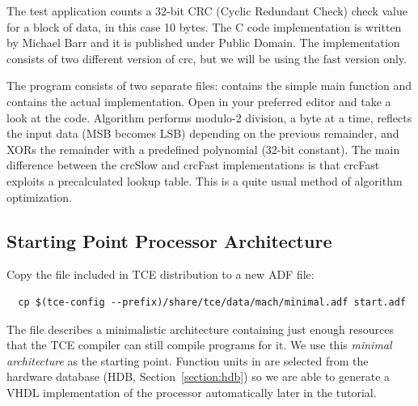 \documentclass[twoside]{tceusermanual}
\begin{document}
The test application counts a 32-bit CRC (Cyclic Redundant Check)
check value for a block of data, in this case 10 bytes. The C code
implementation is written by Michael Barr and it is published under
Public Domain. The implementation consists of two different version of
crc, but we will be using the fast version only.

The program consists of two separate files:  contains the
simple main function and  contains the actual
implementation. Open  in your preferred editor and take a
look at the code. Algorithm performs modulo-2 division, a byte at a
time, reflects the input data (MSB becomes LSB) depending on the
previous remainder, and XORs the remainder with a predefined
polynomial (32-bit constant). The main difference between the crcSlow
and crcFast implementations is that crcFast exploits a precalculated
lookup table. This is a quite usual method of algorithm optimization.

% 
% 
% 

\subsection{Starting Point Processor Architecture}
\label{ssec:start_point}


Copy the  file included in TCE distribution to a new ADF
file:

\begin{verbatim}
  cp $(tce-config --prefix)/share/tce/data/mach/minimal.adf start.adf
\end{verbatim}

The file describes a minimalistic architecture containing just enough
resources that the TCE compiler can still compile programs for it.
We use this {\em minimal architecture} as the starting point.
Function units in  are selected from the hardware
database (HDB, Section~\ref{section:hdb}) so we are able to generate a VHDL
implementation of the processor automatically later in the tutorial.
\end{document}
